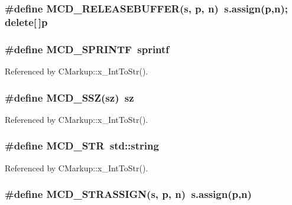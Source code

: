 \subsubsection[MCD\_\-RELEASEBUFFER]{\setlength{\rightskip}{0pt plus 5cm}\#define MCD\_\-RELEASEBUFFER(s, \/  p, \/  n)~s.assign(p,n); delete[$\,$]p}\label{Markup_8h_c7aebf04b6e902c953c2422b65cde140}


\subsubsection[MCD\_\-SPRINTF]{\setlength{\rightskip}{0pt plus 5cm}\#define MCD\_\-SPRINTF~sprintf}\label{Markup_8h_fdebb4fe97791f466e9e52337e36e707}




Referenced by CMarkup::x\_\-IntToStr().
\subsubsection[MCD\_\-SSZ]{\setlength{\rightskip}{0pt plus 5cm}\#define MCD\_\-SSZ(sz)~sz}\label{Markup_8h_c327a6af700343d0cced4ed2bf855460}




Referenced by CMarkup::x\_\-IntToStr().
\subsubsection[MCD\_\-STR]{\setlength{\rightskip}{0pt plus 5cm}\#define MCD\_\-STR~std::string}\label{Markup_8h_1b37b66197558752f7dfcdb82011648b}




Referenced by CMarkup::x\_\-IntToStr().
\subsubsection[MCD\_\-STRASSIGN]{\setlength{\rightskip}{0pt plus 5cm}\#define MCD\_\-STRASSIGN(s, \/  p, \/  n)~s.assign(p,n)}\label{Markup_8h_25a39e06935325797827ef910d1e9c33}


